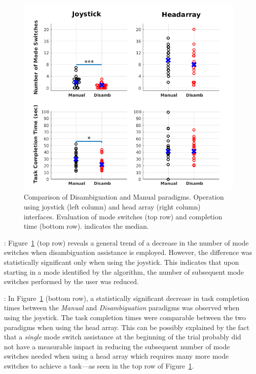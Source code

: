 \documentclass[conference]{IEEEtran}
\begin{document}
\begin{figure}[t]
	\centering
	\includegraphics[width = 1.1\hsize ,center]{./figures/FINAL_PLOT2.png}
	\vspace{-0.7cm}
	\caption{Comparison of Disambiguation and Manual paradigms. Operation using joystick (left column) and head array (right column) interfaces. Evaluation of mode switches (top row) and completion time (bottom row). {} indicates the median.}
	\label{DATAPLOT}
\end{figure}
\vspace{0.1cm}
: Figure~\ref{DATAPLOT} (top row) reveals a general trend of a decrease in the number of mode switches when disambiguation assistance is employed. However, the difference was statistically significant only when using the joystick. This indicates that upon starting in a mode identified by the algorithm, the number of subsequent mode switches performed by the user was reduced. 

\vspace{0.1cm}
: 
In Figure~\ref{DATAPLOT} (bottom row), a statistically significant decrease in task completion times between the \textit{Manual} and \textit{Disambiguation} paradigms was observed when using the joystick. The task completion times were comparable between the two paradigms when using the head array. This can be possibly explained by the fact that a \textit{single} mode switch assistance at the beginning of the trial probably did not have a measurable impact in reducing the subsequent number of mode switches needed when using a head array which requires many more mode switches to achieve a task---as seen in the top row of Figure~\ref{DATAPLOT}. 
\end{document}
